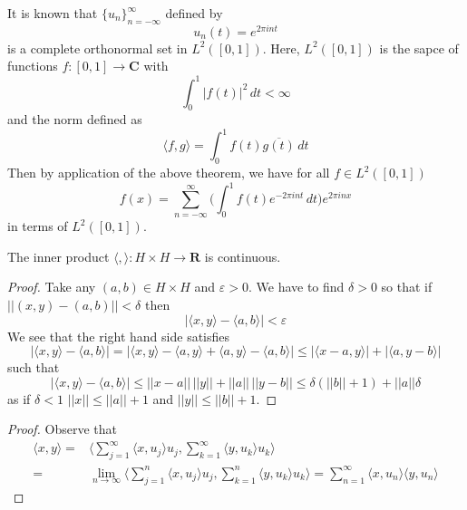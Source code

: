 \begin{cor}
It is known that $\{u_{n}\}^{\infty }_{n=-\infty }$ defined by
\[u_{n}(t)=e^{2\pi int}\]
is a complete orthonormal set in $L^2([0,1])$. Here, $L^2([0,1])$ is the sapce of functions $f:[0,1]\rightarrow {\bm C}$ with
\[\int ^{1}_{0}|f(t)|^2\,dt<\infty\]
and the norm defined as
\[\langle f,g\rangle =\int ^{1}_{0}f(t)\overline{g(t)}\,dt\]
Then by application of the above theorem, we have for all $f\in L^{2}([0,1])$
\[f(x)=\sum ^{\infty }_{n=-\infty }\Big(\int ^{1}_{0}f(t)e^{-2\pi in t}\,dt\Big)e^{2\pi inx} \]
in terms of $L^2([0,1])$. 
\end{cor}
\vspace{2ex}
\begin{lem}
The inner product $\langle ,\rangle :H\times H\rightarrow {\bm R}$ is continuous. 
\end{lem}
\vspace{2ex}
\begin{proof}
Take any $(a,b)\in H\times H$ and $\varepsilon >0$. We have to find $\delta >0$ so that if $||(x,y)-(a,b)||<\delta $ then 
\[|\langle x,y\rangle -\langle a,b\rangle |<\varepsilon \]
We see that the right hand side satisfies
\[|\langle x,y\rangle -\langle a,b\rangle |=|\langle x,y\rangle -\langle a,y\rangle +\langle a,y\rangle -\langle a,b\rangle |\leq |\langle x-a,y\rangle |+|\langle a,y-b\rangle |\]
such that 
\[|\langle x,y\rangle -\langle a,b\rangle |\leq ||x-a||\,||y||+||a||\,||y-b||\leq \delta (||b||+1)+||a||\delta \]
as if $\delta <1$ $||x||\leq ||a||+1$ and $||y||\leq ||b||+1$. 
\end{proof}
\vspace{2ex}
\begin{proof}
Observe that
\begin{align*}
\langle x,y\rangle =&\langle \sum ^{\infty }_{j=1}\langle x,u_{j}\rangle u_{j},\sum ^{\infty }_{k=1}\langle y,u_{k}\rangle u_{k}\rangle \\
=&\lim _{n\rightarrow \infty }\langle \sum ^{n}_{j=1}\langle x,u_{j}\rangle u_{j},\sum ^{n}_{k=1}\langle y,u_{k}\rangle u_{k}\rangle =\sum ^{\infty }_{n=1}\langle x,u_{n}\rangle \langle y,u_{n}\rangle 
\end{align*}
\end{proof}
\vspace{2ex}

